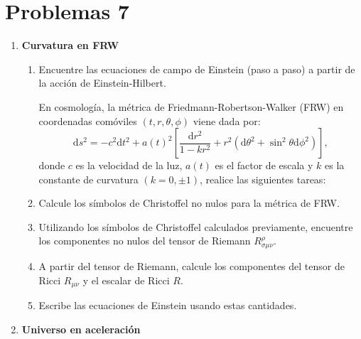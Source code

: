 \documentclass[../main]{subfiles}
\begin{document}
\section{Problemas 7}
\begin{enumerate}
    \item \textbf{Curvatura en FRW}
    \begin{enumerate}[label=(\alph*)]
        \item Encuentre las ecuaciones de campo de Einstein (paso a paso) a partir de la acción de Einstein-Hilbert.
        
        En cosmología, la métrica de Friedmann-Robertson-Walker (FRW) en coordenadas comóviles $(t, r, \theta, \phi)$ viene dada por:
        \begin{equation}
            \mathrm{d}s^2=-c^2\mathrm{d}t^2+a(t)^2\left[\dfrac{\mathrm{d}r^2}{1-kr^2}+r^2(\mathrm{d}\theta^2+\sin^2 \theta \mathrm{d}\phi^2)\right],
        \end{equation}
        donde $c$ es la velocidad de la luz, $a(t)$ es el factor de escala y $k$ es la constante de curvatura $(k=0, \pm 1)$, realice las siguientes tareas:
        \item Calcule los símbolos de Christoffel no nulos para la métrica de FRW.
        \item Utilizando los símbolos de Christoffel calculados previamente, encuentre los componentes no nulos del tensor de Riemann $R^{\rho}_{\sigma\mu\nu}$.
        \item A partir del tensor de Riemann, calcule los componentes del tensor de Ricci $R_{\mu\nu}$ y el escalar de Ricci $R$.
        \item Escribe las ecuaciones de Einstein usando estas cantidades.
    \end{enumerate}
    \item \textbf{Universo en aceleración}
    

\end{enumerate}
\end{document}
